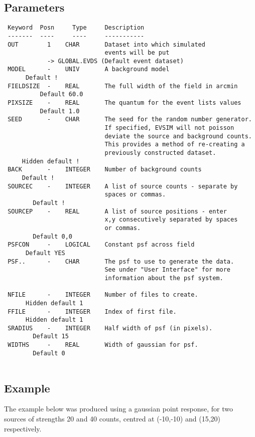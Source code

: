 \documentclass{book}
\renewcommand{\_}{{\tt\char'137}}     %
\begin{document}
\subsection{Parameters}
\begin{verbatim}
 Keyword  Posn     Type     Description
 -------  ----     ----     -----------
 OUT        1    CHAR       Dataset into which simulated
                            events will be put
            -> GLOBAL.EVDS (Default event dataset)
 MODEL      -    UNIV       A background model
      Default !
 FIELDSIZE  -    REAL       The full width of the field in arcmin
          Default 60.0
 PIXSIZE    -    REAL       The quantum for the event lists values
          Default 1.0
 SEED       -    CHAR       The seed for the random number generator.
                            If specified, EVSIM will not poisson
                            deviate the source and background counts.
                            This provides a method of re-creating a
                            previously constructed dataset.
     Hidden default !
 BACK       -    INTEGER    Number of background counts
     Default !
 SOURCEC    -    INTEGER    A list of source counts - separate by
                            spaces or commas.
        Default !
 SOURCEP    -    REAL       A list of source positions - enter
                            x,y consecutively separated by spaces
                            or commas.
        Default 0,0
 PSFCON     -    LOGICAL    Constant psf across field
      Default YES
 PSF..      -    CHAR       The psf to use to generate the data.
                            See under "User Interface" for more
                            information about the psf system.
 
 NFILE      -    INTEGER    Number of files to create.
      Hidden default 1
 FFILE      -    INTEGER    Index of first file.
      Hidden default 1
 SRADIUS    -    INTEGER    Half width of psf (in pixels).
        Default 15
 WIDTHS     -    REAL       Width of gaussian for psf.
        Default 0
 
\end{verbatim}\subsection{Example}
The example below was produced using a gaussian point response,
for two sources of strengths 20 and 40 counts, centred at (-10,-10)
and (15,20) respectively.
\end{document}
